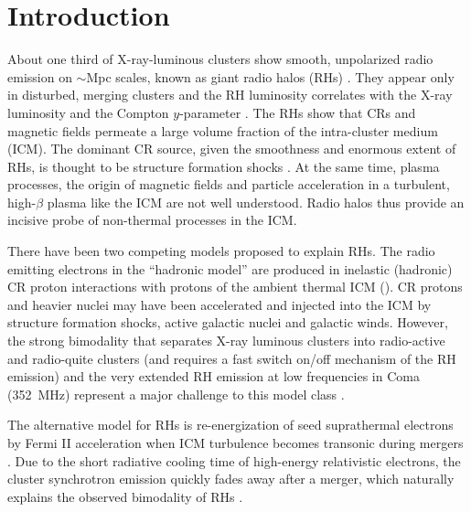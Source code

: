 \documentclass[useAMS,usenatbib]{mn2e}
\begin{document}
\section{Introduction}
About one third of X-ray-luminous clusters show smooth, unpolarized
radio emission on $\sim$Mpc scales, known as giant radio halos (RHs)
\citep{2014IJMPD..2330007B}. They appear only in disturbed, merging
clusters and the RH luminosity correlates with the X-ray luminosity
\citep{2001A&A...369..441G,2012A&ARv..20...54F} and the Compton
$y$-parameter \citep{2013A&A...554A.140P}. The RHs show that CRs and
magnetic fields permeate a large volume fraction of the intra-cluster
medium (ICM). The dominant CR source, given the smoothness and
enormous extent of RHs, is thought to be structure formation shocks
\citep{miniati01,pfrommer08}. At the same time, plasma processes, the
origin of magnetic fields and particle acceleration in a turbulent,
high-$\beta$ plasma like the ICM are not well understood. Radio halos
thus provide an incisive probe of non-thermal processes in the ICM.

There have been two competing models proposed to explain RHs.  The
radio emitting electrons in the ``hadronic model'' are produced in
inelastic (hadronic) CR proton interactions with protons of the
ambient thermal ICM
(\citealp{1980ApJ...239L..93D,1999APh....12..169B,2001ApJ...562..233M,
  2004A&A...413...17P,2008MNRAS.385.1211P,ensslin11}). CR protons and
heavier nuclei may have been accelerated and injected into the ICM by
structure formation shocks, active galactic nuclei and galactic
winds. However, the strong bimodality that separates X-ray luminous
clusters into radio-active and radio-quite clusters (and requires a
fast switch on/off mechanism of the RH emission) and the very extended
RH emission at low frequencies in Coma (352~MHz) represent a major
challenge to this model class \citep{brunetti12,2014MNRAS.438..124Z}.

The alternative model for RHs is re-energization of seed suprathermal
electrons by Fermi II acceleration when ICM turbulence becomes
transonic during mergers
\citep{1987A&A...182...21S,1993ApJ...406..399G,2001MNRAS.320..365B,
  2004MNRAS.350.1174B,brunetti07,brunetti11,2015ApJ...800...60M}. Due
to the short radiative cooling time of high-energy relativistic
electrons, the cluster synchrotron emission quickly fades away after a
merger, which naturally explains the observed bimodality of RHs
\cite[see e.g.][]{2013MNRAS.429.3564D,2014MNRAS.443.3564D}.
\end{document}
